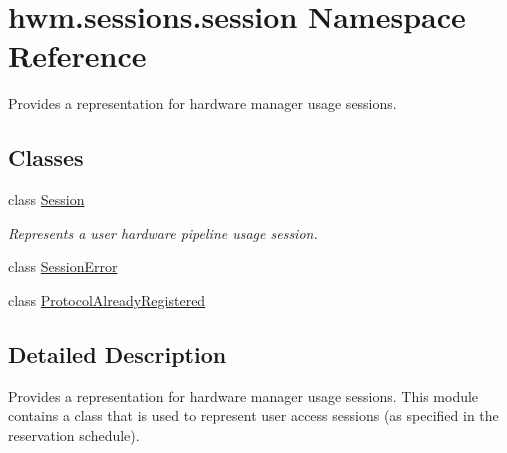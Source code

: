 \hypertarget{namespacehwm_1_1sessions_1_1session}{\section{hwm.\-sessions.\-session Namespace Reference}
\label{namespacehwm_1_1sessions_1_1session}
}


Provides a representation for hardware manager usage sessions.  


\subsection*{Classes}
\begin{DoxyCompactItemize}
\item 
class \hyperlink{classhwm_1_1sessions_1_1session_1_1_session}{Session}
\begin{DoxyCompactList}\small\item\em Represents a user hardware pipeline usage session. \end{DoxyCompactList}\item 
class \hyperlink{classhwm_1_1sessions_1_1session_1_1_session_error}{Session\-Error}
\item 
class \hyperlink{classhwm_1_1sessions_1_1session_1_1_protocol_already_registered}{Protocol\-Already\-Registered}
\end{DoxyCompactItemize}


\subsection{Detailed Description}
Provides a representation for hardware manager usage sessions. This module contains a class that is used to represent user access sessions (as specified in the reservation schedule). 